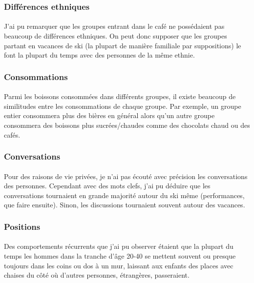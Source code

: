 \subsubsection{Différences ethniques}

\paragraph{} J'ai pu remarquer que les groupes entrant dans le café ne
possédaient pas beaucoup de différences ethniques. On peut donc supposer que
les groupes partant en vacances de ski (la plupart de manière familiale par
suppositions) le font la plupart du temps avec des personnes de la même ethnie.

\subsubsection{Consommations}

\paragraph{} Parmi les boissons consommées dans différents groupes, il existe
beaucoup de similitudes entre les consommations de chaque groupe. Par exemple,
un groupe entier consommera plus des bières en général alors qu'un autre groupe
consommera des boissons plus sucrées/chaudes comme des chocolats chaud ou des
cafés.

\subsubsection{Conversations}

\paragraph{} Pour des raisons de vie privées, je n'ai pas écouté avec précision
les conversations des personnes. Cependant avec des mots clefs, j'ai pu déduire
que les conversations tournaient en grande majorité autour du ski même
(performances, que faire ensuite). Sinon, les discussions tournaient souvent
autour des vacances.

\subsubsection{Positions}

\paragraph{} Des comportements récurrents que j'ai pu observer étaient que la
plupart du temps les hommes dans la tranche d'âge 20-40 se mettent souvent ou
presque toujours dans les coins ou dos à un mur, laissant aux enfants des
places avec chaises du côté où d'autres personnes, étrangères, passeraient.

